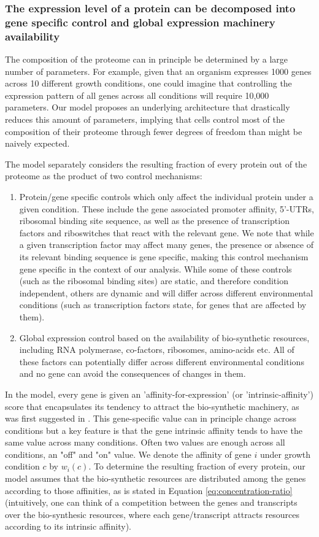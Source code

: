 \subsubsection{The expression level of a protein can be decomposed into gene specific control and global
expression machinery availability}
The composition of the proteome can in principle be determined by a large number of parameters.
For example, given that an organism expresses 1000 genes across 10 different growth conditions, one could imagine that controlling the expression pattern of all genes across all conditions will require 10,000 parameters.
Our model proposes an underlying architecture that drastically reduces this amount of parameters, implying that cells control most of the composition of their proteome through fewer degrees of freedom than might be naively expected.

The model separately considers the resulting fraction of every protein out of the proteome as the product of two control mechanisms:
\begin{enumerate}
\item Protein/gene specific controls which only affect the individual protein under a given condition.
These include the gene associated promoter affinity, 5'-UTRs, ribosomal binding site sequence, as well as the presence of transcription factors and riboswitches that react with the relevant gene.
We note that while a given transcription factor may affect many genes, the presence or absence of its relevant binding sequence is gene specific, making this control mechanism gene specific in the context of our analysis.
  While some of these controls (such as the ribosomal binding sites) are static, and therefore condition independent, others are dynamic and will differ across different environmental conditions (such as transcription factors state, for genes that are affected by them).
\item Global expression control based on the availability of bio-synthetic resources, including RNA polymerase, co-factors, ribosomes, amino-acids etc.
  All of these factors can potentially differ across different environmental conditions and no gene can avoid the consequences of changes in them.
\end{enumerate}

In the model, every gene is given an 'affinity-for-expression' (or 'intrinsic-affinity') score that encapsulates its tendency to attract the bio-synthetic machinery, as was first suggested in \cite{Maaloe1969}.
This gene-specific value can in principle change across conditions but a key feature is that the gene intrinsic affinity tends to have the same value across many conditions.
Often two values are enough across all conditions, an "off" and "on" value.
We denote the affinity of gene $i$ under growth condition $c$ by $w_i(c)$.
To determine the resulting fraction of every protein, our model assumes that the bio-synthetic resources are distributed among the genes according to those affinities, as is stated in Equation \ref{eq:concentration-ratio} (intuitively, one can think of a competition between the genes and transcripts over the bio-synthesic resources, where each gene/transcript attracts resources according to its intrinsic affinity).

